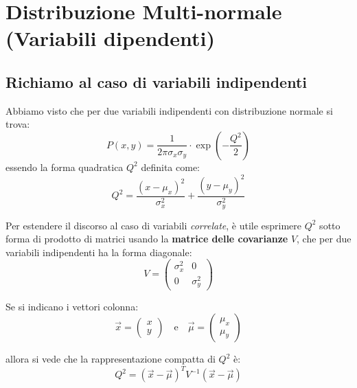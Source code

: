 \documentclass[openany,a4paper,12pt]{book}
\theoremstyle{remark}
\begin{document}
\section{Distribuzione Multi-normale (Variabili dipendenti)}
\subsection*{Richiamo al caso di variabili indipendenti}
Abbiamo visto che per due variabili indipendenti con distribuzione normale si trova:
\begin{equation}
P(x,y) = \frac{1}{2\pi\sigma_x\sigma_y} \cdot \exp\left(-\frac{Q^2}{2}\right)
\end{equation}
essendo la forma quadratica $Q^2$ definita come:
\begin{equation}
Q^2 = \frac{(x-\mu_x)^2}{\sigma_x^2} + \frac{(y-\mu_y)^2}{\sigma_y^2}
\end{equation}

Per estendere il discorso al caso di variabili \emph{correlate}, è utile esprimere $Q^2$ sotto forma di prodotto di matrici usando la \textbf{matrice delle covarianze} $V$, che per due variabili indipendenti ha la forma diagonale:
\begin{equation}
V = \begin{pmatrix}
\sigma_x^2 & 0 \\
0 & \sigma_y^2
\end{pmatrix}
\end{equation}

Se si indicano i vettori colonna:
\begin{equation*}
\vec{x} = \begin{pmatrix} x \\ y \end{pmatrix} \quad \text{e} \quad \vec{\mu} = \begin{pmatrix} \mu_x \\ \mu_y \end{pmatrix}
\end{equation*}

allora si vede che la rappresentazione compatta di $Q^2$ è:
\begin{equation}
Q^2 = (\vec{x} - \vec{\mu})^T V^{-1} (\vec{x} - \vec{\mu})
\end{equation}
\end{document}
